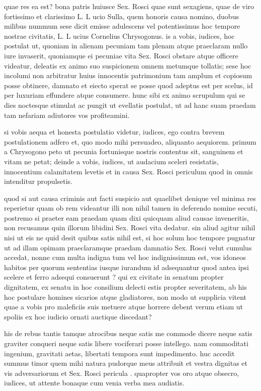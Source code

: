  quae res ea est? bona patris huiusce Sex. Rosci quae sunt sexagiens, quae de viro fortissimo et clarissimo L. L ucio Sulla, quem honoris causa nomino, duobus milibus nummum sese dicit emisse adulescens vel potentissimus hoc tempore nostrae civitatis, L. L ucius Cornelius Chrysogonus. is a vobis, iudices, hoc postulat ut, quoniam in alienam pecuniam tam plenam atque praeclaram nullo iure invaserit, quoniamque ei pecuniae vita Sex. Rosci obstare atque officere videatur, deleatis ex animo suo suspicionem omnem metumque tollatis; sese hoc incolumi non arbitratur huius innocentis patrimonium tam amplum et copiosum posse obtinere, damnato et eiecto sperat se posse quod adeptus est per scelus, id per luxuriam effundere atque consumere. hunc sibi ex animo scrupulum qui se dies noctesque stimulat ac pungit ut evellatis postulat, ut ad hanc suam praedam tam nefariam adiutores vos profiteamini.

 si vobis aequa et honesta postulatio videtur, iudices, ego contra brevem postulationem adfero et, quo modo mihi persuadeo, aliquanto aequiorem. primum a Chrysogono peto ut pecunia fortunisque nostris contentus sit, sanguinem et vitam ne petat; deinde a vobis, iudices, ut audacium sceleri resistatis, innocentium calamitatem levetis et in causa Sex. Rosci periculum quod in omnis intenditur propulsetis.

 quod si aut causa criminis aut facti suspicio aut quaelibet denique vel minima res reperietur quam ob rem videantur illi non nihil tamen in deferendo nomine secuti, postremo si praeter eam praedam quam dixi quicquam aliud causae inveneritis, non recusamus quin illorum libidini Sex. Rosci vita dedatur. sin aliud agitur nihil nisi ut eis ne quid desit quibus satis nihil est, si hoc solum hoc tempore pugnatur ut ad illam opimam praeclaramque praedam damnatio Sex. Rosci velut cumulus accedat, nonne cum multa indigna tum vel hoc indignissimum est, vos idoneos habitos per quorum sententias iusque iurandum id adsequantur quod antea ipsi scelere et ferro adsequi consuerunt ? qui ex civitate in senatum propter dignitatem, ex senatu in hoc consilium delecti estis propter severitatem, ab his hoc postulare homines sicarios atque gladiatores, non modo ut supplicia vitent quae a vobis pro maleficiis suis metuere atque horrere debent verum etiam ut spoliis ex hoc iudicio ornati auctique discedant?

 his de rebus tantis tamque atrocibus neque satis me commode dicere neque satis graviter conqueri neque satis libere vociferari posse intellego. nam commoditati ingenium, gravitati aetas, libertati tempora sunt impedimento. huc accedit summus timor quem mihi natura pudorque meus attribuit et vestra dignitas et vis adversariorum et Sex. Rosci pericula . quapropter vos oro atque obsecro, iudices, ut attente bonaque cum venia verba mea audiatis.

